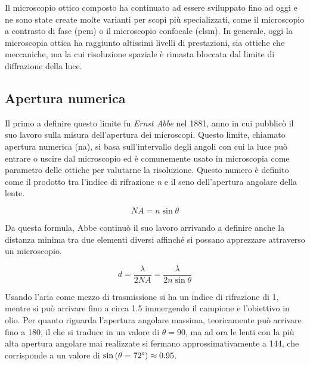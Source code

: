 \documentclass[../main.tex]{subfiles}
\begin{document}
Il microscopio ottico composto ha continuato ad essere sviluppato fino ad oggi e ne sono state create molte varianti per scopi più specializzati, come il microscopio a contrasto di fase (\acrshort{pcm})\cite{zernike_1955} o il microscopio confocale (\acrshort{clsm})\cite{pawley_2006}. In generale, oggi la microscopia ottica ha raggiunto altissimi livelli di prestazioni, sia ottiche che meccaniche, ma la cui risoluzione spaziale è rimasta bloccata dal limite di diffrazione della luce.

\subsection{Apertura numerica}

Il primo a definire questo limite fu \textit{Ernst Abbe} nel 1881, anno in cui pubblicò il suo lavoro sulla misura dell'apertura dei microscopi.\cite{abbe_1881} Questo limite, chiamato apertura numerica (\acrshort{na}), si basa sull'intervallo degli angoli con cui la luce può entrare o uscire dal microscopio  ed è comunemente usato in microscopia come parametro delle ottiche per valutarne la risoluzione. Questo numero è definito come il prodotto tra l'indice di rifrazione \textit{n} e il seno dell'apertura angolare della lente.

\begin{equation}
	\mathit{NA}=n\sin\theta
\end{equation}

Da questa formula, Abbe continuò il suo lavoro arrivando a definire anche la distanza minima tra due elementi diversi affinché si possano apprezzare attraverso un microscopio.\cite{abbe_1882}

\begin{equation}
d=\frac{\lambda}{2\mathit{NA}}=\frac{\lambda}{2n\sin\theta}
\end{equation}

Usando l'aria come mezzo di trasmissione si ha un indice di rifrazione di 1, mentre si può arrivare fino a circa 1.5 immergendo il campione e l'obiettivo in olio. Per quanto riguarda l'apertura angolare massima,  teoricamente può arrivare fino a 180\degree, il che si traduce in un valore di $\theta=90$\degree, ma ad ora le lenti con la più alta apertura angolare mai realizzate si fermano approssimativamente a 144\degree, che corrisponde a un valore di $\sin\left(\theta=72\degree\right) \approx 0.95$.\cite{leica_aperture}\\
\end{document}

